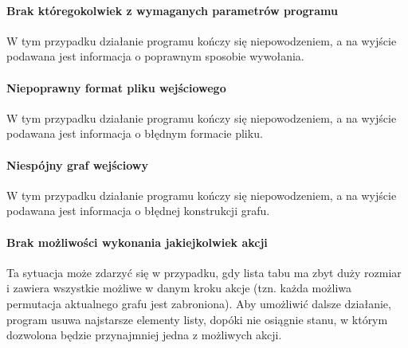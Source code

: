 \paragraph{Brak któregokolwiek z wymaganych parametrów programu}
W tym przypadku działanie programu kończy się niepowodzeniem, a na wyjście podawana jest informacja o poprawnym sposobie wywołania.

\paragraph{Niepoprawny format pliku wejściowego}
W tym przypadku działanie programu kończy się niepowodzeniem, a na wyjście podawana jest informacja o błędnym formacie pliku.

\paragraph{Niespójny graf wejściowy}
W tym przypadku działanie programu kończy się niepowodzeniem, a na wyjście podawana jest informacja o błędnej konstrukcji grafu.

\paragraph{Brak możliwości wykonania jakiejkolwiek akcji}
Ta sytuacja może zdarzyć się w przypadku, gdy lista tabu ma zbyt duży rozmiar i zawiera wszystkie możliwe w danym kroku akcje (tzn. każda możliwa permutacja aktualnego grafu jest zabroniona).
Aby umożliwić dalsze działanie, program usuwa najstarsze elementy listy, dopóki nie osiągnie stanu, w którym dozwolona będzie przynajmniej jedna z możliwych akcji.